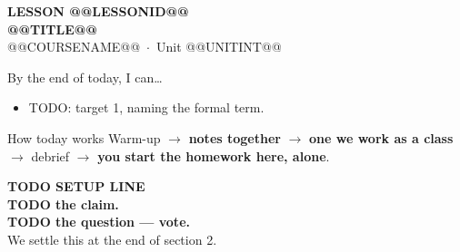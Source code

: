 \documentclass[aspectratio=169, 11pt]{beamer}
\begin{document}
{
\begin{frame}[plain]
  \vspace{2.8cm}\hspace{0.55cm}%
  \begin{minipage}{0.9\textwidth}
    {\color{goldacc}\bfseries\small LESSON @@LESSONID@@}\\[0.5cm]
    {\color{white}\bfseries\LARGE @@TITLE@@}\\[1.2cm]
    {\color{frostmid}\small @@COURSENAME@@~$\cdot$~Unit @@UNITINT@@}
  \end{minipage}
\end{frame}
}

\begin{frame}[t, plain]
  By the end of today, I can\ldots
  \begin{itemize}\setlength{\itemsep}{5pt}
    \item TODO: target 1, naming the formal term.
  \end{itemize}
  \begin{block}{How today works}
    Warm-up $\to$ \textbf{notes together} $\to$ \textbf{one we work as a class} $\to$
    debrief $\to$ \textbf{you start the homework here, alone}.
  \end{block}
\end{frame}

\begin{frame}[t, plain]
\end{frame}

{
\begin{frame}[plain]
  \vspace{1.3cm}
  \begin{center}
    {\color{frostmid}\bfseries\small TODO SETUP LINE}\\[0.8cm]
    {\color{white}\bfseries\Large TODO the claim.}\\[0.9cm]
    {\color{goldacc}\bfseries\large TODO the question --- vote.}\\[0.5cm]
    {\color{frostmid}\small We settle this at the end of section 2.}
  \end{center}
\end{frame}
}
\end{document}
